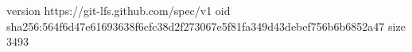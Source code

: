 version https://git-lfs.github.com/spec/v1
oid sha256:564f6d47e61693638f6cfc38d2f273067e5f81fa349d43debef756b6b6852a47
size 3493
